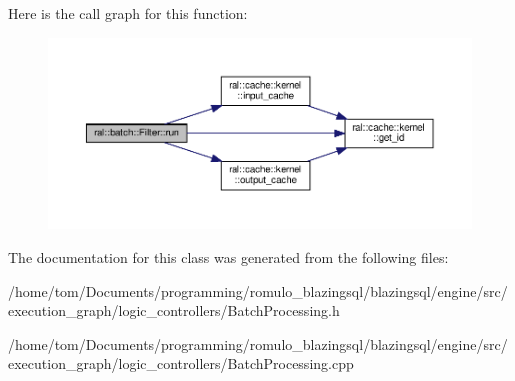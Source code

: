Here is the call graph for this function\+:\nopagebreak
\begin{figure}[H]
\begin{center}
\leavevmode
\includegraphics[width=350pt]{classral_1_1batch_1_1Filter_acae535218dc139f0db24b80cb39353c2_cgraph}
\end{center}
\end{figure}


The documentation for this class was generated from the following files\+:\begin{DoxyCompactItemize}
\item 
/home/tom/\+Documents/programming/romulo\+\_\+blazingsql/blazingsql/engine/src/execution\+\_\+graph/logic\+\_\+controllers/Batch\+Processing.\+h\item 
/home/tom/\+Documents/programming/romulo\+\_\+blazingsql/blazingsql/engine/src/execution\+\_\+graph/logic\+\_\+controllers/Batch\+Processing.\+cpp\end{DoxyCompactItemize}
